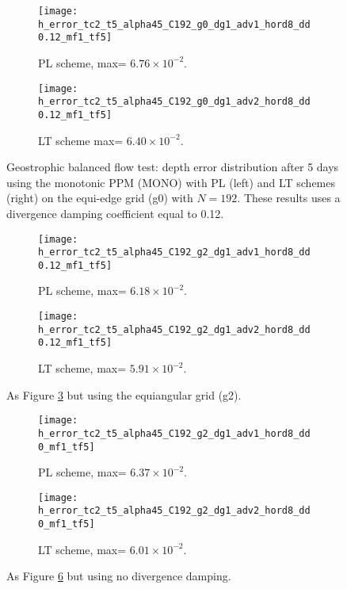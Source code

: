 \begin{figure}[!h]
	\centering
	\begin{subfigure}{0.48\textwidth}
		\centering
		\texttt{[image: h\_error\_tc2\_t5\_alpha45\_C192\_g0\_dg1\_adv1\_hord8\_dd0.12\_mf1\_tf5]}
		\caption{PL scheme, max= $6.76\times10^{-2}$.\label{chp-advcs-sec-exp-sw1-errors-0a}}
	\end{subfigure}
	\begin{subfigure}{0.48\textwidth}
		\centering
		\texttt{[image: h\_error\_tc2\_t5\_alpha45\_C192\_g0\_dg1\_adv2\_hord8\_dd0.12\_mf1\_tf5]}
		\caption{LT scheme max= $6.40\times10^{-2}$.\label{chp-advcs-sec-exp-sw1-errors-0b}}
	\end{subfigure}
	\caption{
		Geostrophic balanced flow test: depth error distribution after 5 days using the monotonic PPM (MONO)
		with PL (left) and LT schemes (right) on the equi-edge grid (g0) with $N=192$. 
		These results uses a divergence damping coefficient equal to 0.12.
		\label{chp-advcs-sec-exp-sw1-errors-0}}
\end{figure}

\begin{figure}[!h]
	\centering
	\begin{subfigure}{0.48\textwidth}
		\centering
		\texttt{[image: h\_error\_tc2\_t5\_alpha45\_C192\_g2\_dg1\_adv1\_hord8\_dd0.12\_mf1\_tf5]}
		\caption{PL scheme,  max= $6.18\times10^{-2}$.\label{chp-advcs-sec-exp-sw1-errors-2a}}
	\end{subfigure}
	\begin{subfigure}{0.48\textwidth}
		\centering
		\texttt{[image: h\_error\_tc2\_t5\_alpha45\_C192\_g2\_dg1\_adv2\_hord8\_dd0.12\_mf1\_tf5]}
		\caption{LT scheme, max= $5.91\times10^{-2}$.\label{chp-advcs-sec-exp-sw1-errors-2b}}
	\end{subfigure}
	\caption{As Figure \ref{chp-advcs-sec-exp-sw1-errors-0} but using the equiangular grid (g2).
		\label{chp-advcs-sec-exp-sw1-errors-2}}
\end{figure}

\newpage

\begin{figure}[!h]
	\centering
	\begin{subfigure}{0.48\textwidth}
		\centering
		\texttt{[image: h\_error\_tc2\_t5\_alpha45\_C192\_g2\_dg1\_adv1\_hord8\_dd0\_mf1\_tf5]}
		\caption{PL scheme,  max= $6.37\times10^{-2}$.\label{chp-advcs-sec-exp-sw1-errors-3a}}
	\end{subfigure}
	\begin{subfigure}{0.48\textwidth}
		\centering
		\texttt{[image: h\_error\_tc2\_t5\_alpha45\_C192\_g2\_dg1\_adv2\_hord8\_dd0\_mf1\_tf5]}
		\caption{LT scheme, max= $6.01\times10^{-2}$.\label{chp-advcs-sec-exp-sw1-errors-3b}}
	\end{subfigure}
	\caption{As Figure \ref{chp-advcs-sec-exp-sw1-errors-2} but using no divergence damping.\label{chp-advcs-sec-exp-sw1-errors-3}}
\end{figure}



